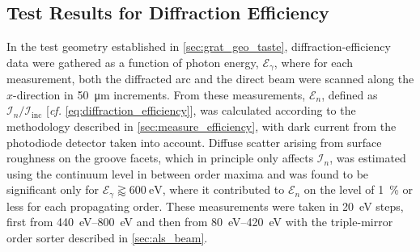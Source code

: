\subsection{Test Results for Diffraction Efficiency}\label{sec:test_results_taste}
In the test geometry established in \cref{sec:grat_geo_taste}, diffraction-efficiency data were gathered as a function of photon energy, $\mathcal{E}_{\gamma}$, where for each measurement, both the diffracted arc and the direct beam were scanned along the $x$-direction in \SI{50}{\um} increments. 
From these measurements, $\mathscr{E}_n$, defined as $\mathcal{I}_n / \mathcal{I}_{\text{inc}}$ [\emph{cf.\@} \cref{eq:diffraction_efficiency}], was calculated according to the methodology described in \cref{sec:measure_efficiency}, with dark current from the photodiode detector taken into account. 
Diffuse scatter arising from surface roughness on the groove facets, which in principle only affects $\mathcal{I}_n$, was estimated using the continuum level in between order maxima and was found to be significant only for $\mathcal{E}_{\gamma} \gtrapprox \SI{600}{\electronvolt}$, where it contributed to $\mathscr{E}_n$ on the level of \SI{1}{\percent} or less for each propagating order. 
These measurements were taken in \SI{20}{\electronvolt} steps, first from \SIrange{440}{800}{\electronvolt} and then from \SIrange{80}{420}{\electronvolt} with the triple-mirror order sorter described in \cref{sec:als_beam}.   

